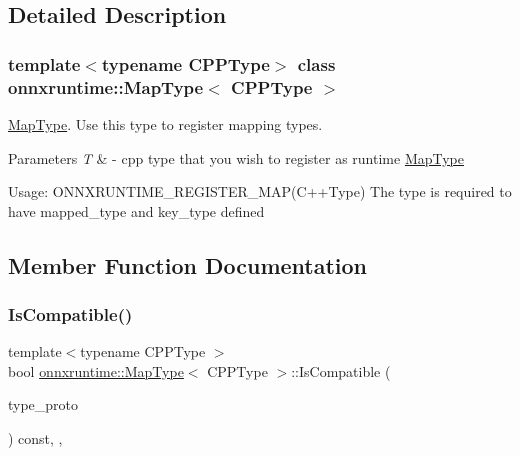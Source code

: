 \subsection{Detailed Description}
\subsubsection*{template$<$typename C\+P\+P\+Type$>$\newline
class onnxruntime\+::\+Map\+Type$<$ C\+P\+P\+Type $>$}

\mbox{\hyperlink{classonnxruntime_1_1MapType}{Map\+Type}}. Use this type to register mapping types. 


\begin{DoxyParams}{Parameters}
{\em T} & -\/ cpp type that you wish to register as runtime \mbox{\hyperlink{classonnxruntime_1_1MapType}{Map\+Type}}\\
\hline
\end{DoxyParams}
Usage\+: O\+N\+N\+X\+R\+U\+N\+T\+I\+M\+E\+\_\+\+R\+E\+G\+I\+S\+T\+E\+R\+\_\+\+M\+AP(C++\+Type) The type is required to have mapped\+\_\+type and key\+\_\+type defined 

\subsection{Member Function Documentation}
\mbox{\label{classonnxruntime_1_1MapType_a4f5bf9ba0f295628b585909bdeaea30c}} 
\subsubsection{\texorpdfstring{Is\+Compatible()}{IsCompatible()}}
{\footnotesize\ttfamily template$<$typename C\+P\+P\+Type $>$ \\
bool \mbox{\hyperlink{classonnxruntime_1_1MapType}{onnxruntime\+::\+Map\+Type}}$<$ C\+P\+P\+Type $>$\+::Is\+Compatible (\begin{DoxyParamCaption}\item[{const O\+N\+N\+X\+\_\+\+N\+A\+M\+E\+S\+P\+A\+C\+E\+::\+Type\+Proto \&}]{type\+\_\+proto }\end{DoxyParamCaption}) const\hspace{0.3cm}{\ttfamily [inline]}, {\ttfamily [override]}, {\ttfamily [virtual]}}



